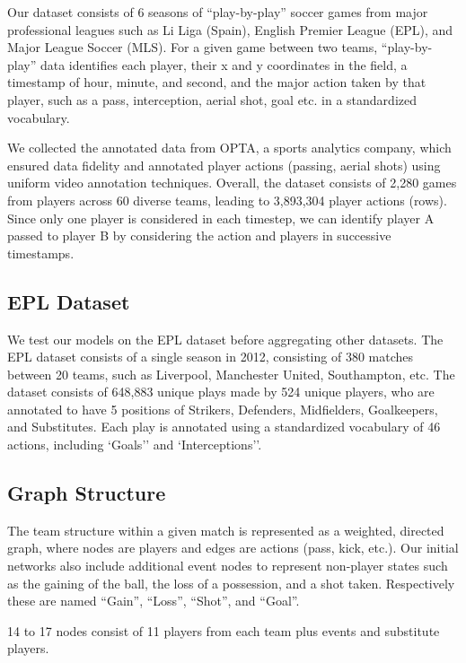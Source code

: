 Our dataset consists of 6 seasons of ``play-by-play'' soccer games from major professional leagues such as Li Liga (Spain), English Premier League (EPL), and Major League Soccer (MLS). For a given game between two teams, ``play-by-play'' data identifies each player, their x and y coordinates in the field, a timestamp of hour, minute, and second, and the major action taken by that player, such as a pass, interception, aerial shot, goal etc. in a standardized vocabulary. 

We collected the annotated data from OPTA, a sports analytics company, which ensured data fidelity and annotated player actions (passing, aerial shots) using uniform video annotation techniques. Overall, the dataset consists of 2,280 games from  players across 60 diverse teams, leading to  3,893,304 player actions (rows). Since only one player is considered in each timestep, we can identify player A passed to player B by considering the action and players in successive timestamps.  

\subsection{EPL Dataset}
We test our models on the EPL dataset before aggregating other datasets. The EPL dataset consists of a single season in 2012, consisting of 380 matches between 20 teams, such as Liverpool, Manchester United, Southampton, etc. The dataset consists of 648,883 unique plays made by 524 unique players, who are annotated to have 5 positions of Strikers, Defenders, Midfielders, Goalkeepers, and Substitutes. Each play is annotated using a standardized vocabulary of 46 actions, including `Goals'' and `Interceptions''.


\subsection{Graph Structure}
The team structure within a given match is represented as a weighted, directed graph, where nodes are players and edges are actions (pass, kick, etc.). Our initial networks also include additional event nodes to represent non-player states such as the gaining of the ball, the loss of a possession, and a shot taken. Respectively these are named ``Gain'', ``Loss'', ``Shot'', and ``Goal''. 

  14 to 17 nodes consist of 11 players from each team plus events and substitute players. 

